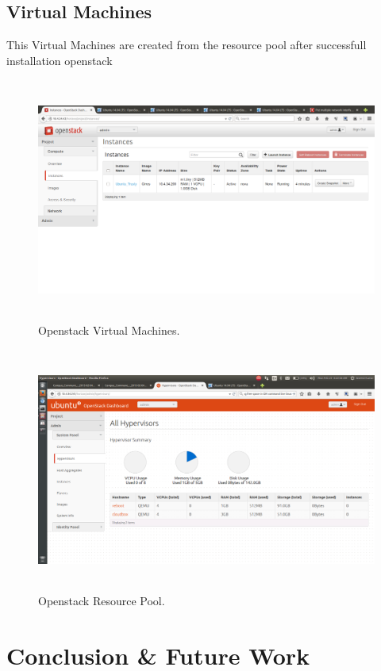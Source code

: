 \documentclass[12pt]{report}
\begin{document}
\section{Virtual Machines}
This Virtual Machines are created from the resource pool after successfull installation openstack
\begin{figure}[H]
	\begin{center}
	\includegraphics[width=12cm,height=8cm]{./openstack_2.png}
	\caption{ Openstack Virtual Machines.\label{fig:Openstack Virtual Machines }}
	\end{center}
\end{figure}
\begin{figure}[H]
	\begin{center}
	\includegraphics[width=12cm,height=8cm]{./openstack_3.png}
	\caption{ Openstack Resource Pool.\label{fig:Openstack Resource Pool }}
	\end{center}
\end{figure}
\chapter{Conclusion \& Future Work}
\end{document}
